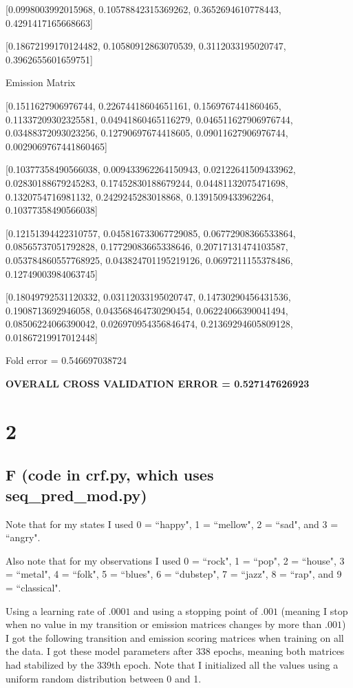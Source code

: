 \documentclass{article}
\begin{document}
[0.0998003992015968, 0.10578842315369262, 0.3652694610778443, 0.4291417165668663]

[0.18672199170124482, 0.10580912863070539, 0.3112033195020747, 0.3962655601659751]

Emission Matrix

[0.1511627906976744, 0.22674418604651161, 0.1569767441860465, 0.11337209302325581, 0.04941860465116279, 0.046511627906976744, 0.03488372093023256, 0.12790697674418605, 0.09011627906976744, 0.0029069767441860465]

[0.10377358490566038, 0.009433962264150943, 0.02122641509433962, 0.02830188679245283, 0.17452830188679244, 0.04481132075471698, 0.1320754716981132, 0.2429245283018868, 0.1391509433962264, 0.10377358490566038]

[0.12151394422310757, 0.045816733067729085, 0.06772908366533864, 0.08565737051792828, 0.17729083665338646, 0.20717131474103587, 0.053784860557768925, 0.043824701195219126, 0.0697211155378486, 0.12749003984063745]

[0.18049792531120332, 0.03112033195020747, 0.14730290456431536, 0.1908713692946058, 0.043568464730290454, 0.06224066390041494, 0.08506224066390042, 0.026970954356846474, 0.21369294605809128, 0.01867219917012448]

Fold error = 0.546697038724

\textbf{OVERALL CROSS VALIDATION ERROR = 0.527147626923}

\section*{2}
\subsection*{F (code in crf.py, which uses seq\_pred\_mod.py)}
Note that for my states I used 0 = ``happy", 1 = ``mellow",
2 = ``sad", and 3 = ``angry".

Also note that for my observations I used 0 = ``rock", 1 = ``pop", 2 = ``house",
3 = ``metal", 4 = ``folk", 5 = ``blues", 6 = ``dubstep", 7 = ``jazz", 8 = ``rap",
and 9 = ``classical".

Using a learning rate of $.0001$ and using a stopping point of $.001$ (meaning I stop
when no value in my transition or emission matrices changes by more than $.001$)
I got the following transition and emission scoring matrices when training on all the data.
I got these model parameters after 338 epochs, meaning both matrices had
stabilized by the 339th epoch. Note that I initialized all the values using a uniform
random distribution between 0 and 1.
\end{document}
